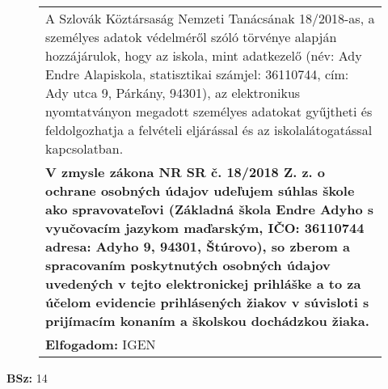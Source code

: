 \documentclass[10pt,a4paper]{article}
\begin{document}
\begin{figure}[!ht]
\begin{tabular}{|m{\textwidth}|}
    \hline \vspace{3pt}
    A Szlovák Köztársaság Nemzeti Tanácsának 18/2018-as, a személyes adatok védelméről szóló törvénye alapján hozzájárulok, hogy az iskola, mint adatkezelő (név: Ady Endre Alapiskola, statisztikai számjel: 36110744, cím: Ady utca 9, Párkány, 94301), az elektronikus nyomtatványon megadott személyes adatokat gyűjtheti és feldolgozhatja a felvételi eljárással és az iskolalátogatással kapcsolatban.  \\
    \textbf{V zmysle zákona NR SR č. 18/2018 Z. z. o ochrane osobných údajov udeľujem súhlas škole ako spravovateľovi (Základná škola Endre Adyho s vyučovacím jazykom maďarským, IČO: 36110744 adresa: Adyho 9, 94301, Štúrovo), so zberom a spracovaním poskytnutých osobných údajov uvedených v tejto elektronickej prihláške a to za účelom evidencie prihlásených žiakov v súvisloti s prijímacím konaním a školskou dochádzkou žiaka.} \vspace{3pt} \\
    \hline \vspace{3pt}
    \textbf{Elfogadom:} \hspace{0.5cm} IGEN \vspace{3pt} \\
    \hline 
    \end{tabular} 
    \end{figure}

    \vfill
    \textbf{BSz: }14
\newpage
\end{document}
